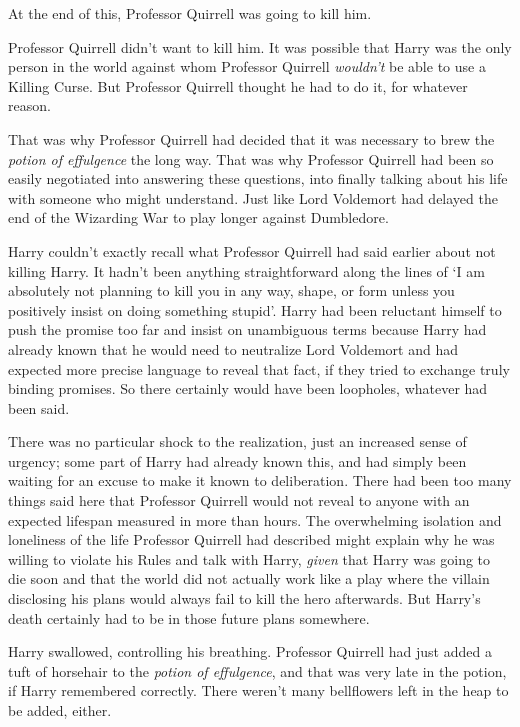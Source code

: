 At the end of this, Professor Quirrell was going to kill him.

Professor Quirrell didn't want to kill him. It was possible that Harry was the only person in the world against whom Professor Quirrell \emph{wouldn't} be able to use a Killing Curse. But Professor Quirrell thought he had to do it, for whatever reason.

That was why Professor Quirrell had decided that it was necessary to brew the \emph{potion of effulgence} the long way. That was why Professor Quirrell had been so easily negotiated into answering these questions, into finally talking about his life with someone who might understand. Just like Lord Voldemort had delayed the end of the Wizarding War to play longer against Dumbledore.

Harry couldn't exactly recall what Professor Quirrell had said earlier about not killing Harry. It hadn't been anything straightforward along the lines of `I am absolutely not planning to kill you in any way, shape, or form unless you positively insist on doing something stupid'. Harry had been reluctant himself to push the promise too far and insist on unambiguous terms because Harry had already known that he would need to neutralize Lord Voldemort and had expected more precise language to reveal that fact, if they tried to exchange truly binding promises. So there certainly would have been loopholes, whatever had been said.

There was no particular shock to the realization, just an increased sense of urgency; some part of Harry had already known this, and had simply been waiting for an excuse to make it known to deliberation. There had been too many things said here that Professor Quirrell would not reveal to anyone with an expected lifespan measured in more than hours. The overwhelming isolation and loneliness of the life Professor Quirrell had described might explain why he was willing to violate his Rules and talk with Harry, \emph{given} that Harry was going to die soon and that the world did not actually work like a play where the villain disclosing his plans would always fail to kill the hero afterwards. But Harry's death certainly had to be in those future plans somewhere.

Harry swallowed, controlling his breathing. Professor Quirrell had just added a tuft of horsehair to the \emph{potion of effulgence}, and that was very late in the potion, if Harry remembered correctly. There weren't many bellflowers left in the heap to be added, either.

